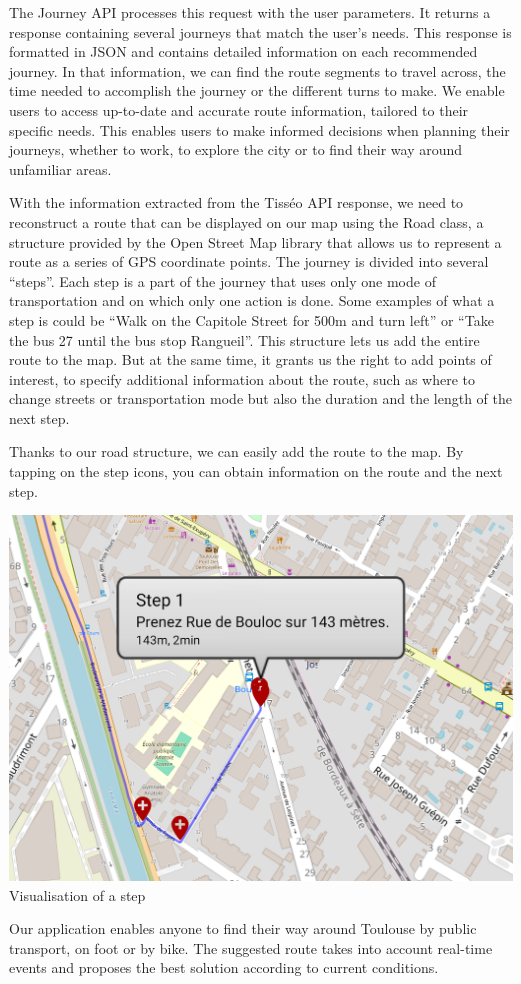The Journey API processes this request with the user parameters. It returns a response containing several journeys that match the user's needs. This response is formatted in JSON and contains detailed information on each recommended journey. In that information, we can find the route segments to travel across, the time needed to accomplish the journey or the different turns to make. We enable users to access up-to-date and accurate route information, tailored to their specific needs. This enables users to make informed decisions when planning their journeys, whether to work, to explore the city or to find their way around unfamiliar areas.\newline

With the information extracted from the Tisséo API response, we need to reconstruct a route that can be displayed on our map using the Road class, a structure provided by the Open Street Map library that allows us to represent a route as a series of GPS coordinate points. The journey is divided into several “steps”. Each step is a part of the journey that uses only one mode of transportation and on which only one action is done. Some examples of what a step is could be “Walk on the Capitole Street for 500m and turn left” or “Take the bus 27 until the bus stop Rangueil”. This structure lets us add the entire route to the map. But at the same time, it grants us the right to add points of interest, to specify additional information about the route, such as where to change streets or transportation mode but also the duration and the length of the next step.\newline

Thanks to our road structure, we can easily add the route to the map. By tapping on the step icons, you can obtain information on the route and the next step.\newline

\begin{center}
\includegraphics[scale=0.30]{content/step_cut.png} 
\newline
Visualisation of a step
\newline
\end{center}

Our application enables anyone to find their way around Toulouse by public transport, on foot or by bike. The suggested route takes into account real-time events and proposes the best solution according to current conditions.\newline
